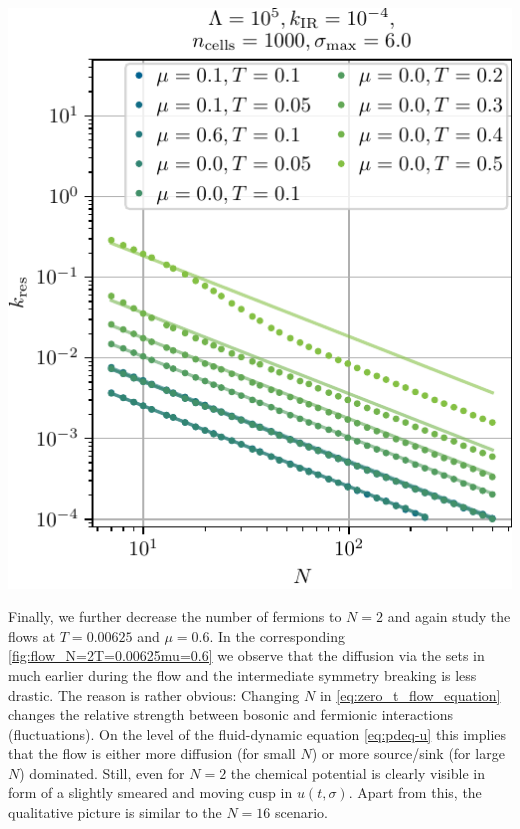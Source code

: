 	{%
		\includegraphics[width=\subcaptionFigureWidth]{gn/figures/Nf_k_restored.pdf} %
		\captionsetup{width=\subcaptionFigureWidth}%
		\caption{%
			Restoration scale $k_\mathrm{res}$, where the \ZII{} symmetry is restored during the \frg{} flow, as a function of the number of fermions $N$ at various points in the $\mu$-$T$-plane, where the \ZII{} symmetry was dynamically broken at $k > k_\mathrm{res}$ by the fermions. For $\mu = 0.1$ and $T = 0.1$ the data points correspond to the yellow stars in \cref{fig:Nf_k_sigma_min}. For the various ($\mu$,$T$)-tuples we include $k_\mathrm{res} ( N ) \propto N^{-1}$ fits ought to be used for optical guidance. Note, that the points for equal temperatures but different chemical potentials are lying on top of each other. In \cref{subsubsec:variablemu} we will discuss this in detail.
		}%
		\label{fig:Nf_k_restored}
	}%
\FloatBarrier
Finally, we further decrease the number of fermions to $N = 2$ and again study the \frg{} flows at $T = 0.00625$ and $\mu = 0.6$. In the corresponding \cref{fig:flow_N=2T=0.00625mu=0.6} we observe that the diffusion via the \sigmaMode{} sets in much earlier during the \frg{} flow and the intermediate symmetry breaking is less drastic. The reason is rather obvious: Changing $N$ in \cref{eq:zero_t_flow_equation} changes the relative strength between bosonic and fermionic interactions (fluctuations). On the level of the fluid-dynamic equation \eqref{eq:pdeq-u} this implies that the flow is either more diffusion (for small $N$) or more source/sink (for large $N$) dominated. Still, even for $N = 2$ the chemical potential is clearly visible in form of a slightly smeared and moving cusp in $u ( t, \sigma )$. Apart from this, the qualitative picture is similar to the $N = 16$ scenario.\FloatBarrier

